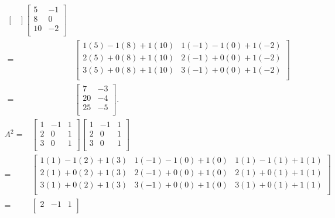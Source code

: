 \documentclass[12pt]{article}
\begin{document}
\begin{enumerate}
\begin{align*}
\begin{bmatrix}
      \end{bmatrix}
      \begin{bmatrix}
        5 & -1\\
        8 & 0\\
        10 & -2\\
      \end{bmatrix}\\
      =&
      \begin{bmatrix}
        1(5) - 1(8) + 1(10) & 1(-1) - 1(0) + 1(-2)\\
        2(5) + 0(8) + 1(10) & 2(-1) + 0(0) + 1(-2)\\
        3(5) + 0(8) + 1(10) & 3(-1) + 0(0) + 1(-2)\\
      \end{bmatrix}\\
      =&
      \begin{bmatrix}
        7  & -3\\
        20 & -4\\
        25 & -5\\
      \end{bmatrix}.
    \end{align*}
    \begin{align*}
      A^{2} =&
      \begin{bmatrix}
        1 & -1 & 1\\
        2 &  0 & 1\\
        3 &  0 & 1\\
      \end{bmatrix}
      \begin{bmatrix}
        1 & -1 & 1\\
        2 &  0 & 1\\
        3 &  0 & 1\\
      \end{bmatrix}\\
      =&
      \begin{bmatrix}
        1(1) - 1(2) + 1(3)
          & 1(-1) - 1(0) + 1(0)
          & 1(1) - 1(1) + 1(1)\\
        2(1) + 0(2) + 1(3)
          & 2(-1) + 0(0) + 1(0)
          & 2(1)  + 0(1) + 1(1)\\
        3(1) + 0(2) + 1(3)
          & 3(-1) + 0(0) + 1(0)
          & 3(1)  + 0(1) + 1(1)\\
      \end{bmatrix}\\
      =&
      \begin{bmatrix}
        2 & -1 & 1\\

\end{bmatrix}
\end{align*}
\end{enumerate}
\end{document}
